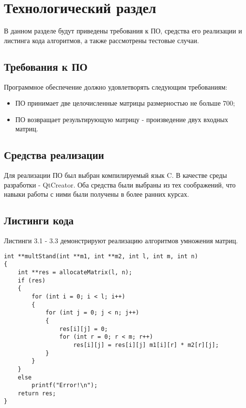 \chapter{Технологический раздел}

В данном разделе будут приведены требования к ПО, средства его реализации и листинга кода алгоритмов, а также рассмотрены тестовые случаи.

\section{Требования к ПО}

Программное обеспечение должно удовлетворять следующим требованиям:
\begin{itemize}
	\item ПО принимает две целочисленные матрицы размерностью не больше 700;
	\item ПО возвращает результирующую матрицу - произведение двух входных матриц.
\end{itemize}

\section{Средства реализации} 

Для реализации ПО был выбран компилируемый язык C. В качестве среды разработки - QtCreator. Оба средства были выбраны из тех соображений, что навыки работы с ними были получены в более ранних курсах.

\section{Листинги кода}

Листинги 3.1 - 3.3 демонстрируют реализацию алгоритмов умножения матриц.

\captionsetup{singlelinecheck = false, justification=raggedright}
\begin{lstlisting}[label=multStand, caption=Стандартный алгоритм умножения матриц]
int **multStand(int **m1, int **m2, int l, int m, int n)
{
    int **res = allocateMatrix(l, n);
    if (res)
    {
        for (int i = 0; i < l; i++)
        {
            for (int j = 0; j < n; j++)
            {
                res[i][j] = 0;
                for (int r = 0; r < m; r++)
                    res[i][j] = res[i][j] m1[i][r] * m2[r][j];
            }
        }
    }
    else
        printf("Error!\n");
    return res;
}
\end{lstlisting}


